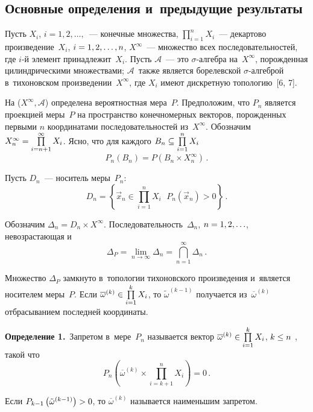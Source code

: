 \begin{multicols}{2}
\vspace*{-10pt}

\section{Основные определения и~предыдущие результаты}

\vspace*{-2pt}

    Пусть $X_i$, $i=1,2,\ldots,$~--- конечные множества, $\prod\limits_{i=1}^n
X_i$~--- декартово произведение~$X_i$, $i\hm=1,2,\ldots, n$, $X^\infty$~---
множество всех последовательностей, где $i$-й элемент принадлежит~$X_i$.
Пусть $\mathcal{A}$~--- это $\sigma$-ал\-геб\-ра на~$X^\infty$, порожденная
цилиндрическими множествами; $\mathcal{A}$~также является борелевской
$\sigma$-ал\-геб\-рой в~тихоновском произведении~$X^\infty$, где $X_i$ имеют
дискретную топологию~[6, 7].

    На ($X^\infty, \mathcal{A}$) определена вероятностная мера~$P$.
Предположим, что $P_n$ является проекцией меры~$P$ на пространство
конечномерных векторов, по\-рож\-ден\-ных первыми $n$ координатами
последовательностей из~$X^\infty$. Обозначим $X_n^\infty \hm=
\prod\limits_{i=n+1}^\infty X_i$. Ясно, что для каждого $B_n\hm\subseteq
\prod\limits_{i=1}^n X_i$
    $$
    P_n(B_n) =P\left( B_n\times X_n^\infty\right)\,.
    $$

    Пусть $D_n$~--- носитель меры~$P_n$:
    $$
    D_n=\left\{ \vec{x}_n\in \prod\limits_{i=1}^n X_i\,\ \ P_n\left(\vec{x}_n\right)
>0\right\}\,.
    $$

    Обозначим $\Delta_n=D_n\times X^\infty$. Последовательность~$\Delta_n$,
$n\hm= 1,2,\ldots$, невозрастающая и
    $$
    \Delta_P=\lim\limits_{n\to\infty} \Delta_n = \mathop{\bigcap}\limits_{n=1}^\infty \Delta_n\,.
    $$

    Множество $\Delta_P$ замкнуто в~топологии тихоновского произведения
и~является носителем меры~$P$. Если $\overline{\omega}^{(k)} \hm\in
\prod\limits_{i=1}^k X_i$, то $\tilde{\omega}^{(k-1)}$ получается
из~$\overline{\omega}^{(k)}$ отбрасыванием последней координаты.

    \smallskip

    \noindent
    \textbf{Определение 1.}\ Запретом в~мере~$P_n$ называется вектор
$\overline{\omega}^{(k)} \hm\in \prod\limits_{i=1}^k X_i$, $k\hm\leq n$ , такой
что
    $$
    P_n \left( \overline{\omega}^{(k)} \times \prod\limits_{i=k+1}^n X_i\right)
=0\,.
    $$

    Если $P_{k-1}\left( \tilde{\omega}^{(k-1)}\right)\hm>0$, то
$\overline{\omega}^{(k)}$ называется наименьшим запретом.


\end{multicols}
